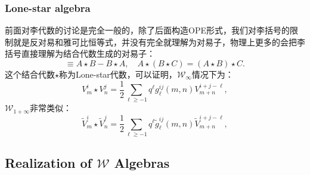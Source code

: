 \subsubsection{Lone-star algebra}
前面对李代数的讨论是完全一般的，除了后面构造OPE形式，我们对李括号的限制就是反对易和雅可比恒等式，并没有完全就理解为对易子，物理上更多的会把李括号直接理解为结合代数生成的对易子：
\begin{equation}
	[A,B]\equiv A\star B-B\star A,\quad A\star(B\star C)=(A\star B)\star C.
\end{equation}
这个结合代数$\star$称为Lone-star代数，可以证明，$\mathcal{W}_\infty$情况下为：
\begin{equation}
	V_m^i\star V_n^j=\frac12\sum_{\ell\geq-1}q^\ell g_\ell^{ij}(m,n)V_{m+n}^{i+j-\ell},
\end{equation}
$\mathcal{W}_{1+\infty}$非常类似：
\begin{equation}
	\widetilde{V}_m^i\star \widetilde{V}_n^j=\frac12\sum_{\ell\geq-1}q^\ell \widetilde{g}_\ell^{ij}(m,n)\widetilde{V}_{m+n}^{i+j-\ell},
\end{equation}
\subsection{Realization of $\mathcal{W}$ Algebras}
